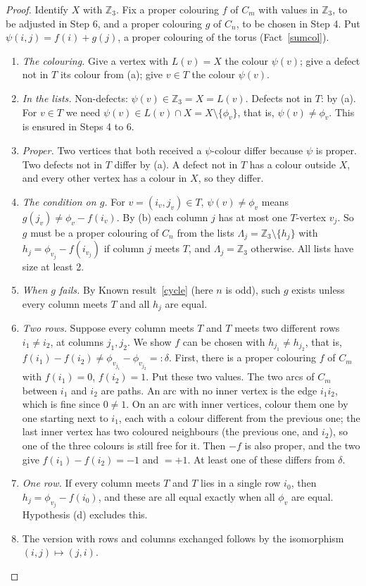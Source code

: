 \documentclass[11pt]{article}
\theoremstyle{plain}
\theoremstyle{definition}
\theoremstyle{remark}
\newcommand{\Z}{\mathbb{Z}}
\newcommand{\sm}{\setminus}
\newenvironment{steps}[1][]{\begin{enumerate}[label=\textbf{Step \arabic*.},leftmargin=4.4em,itemsep=0.35em,#1]}{\end{enumerate}}
\begin{document}
\begin{proof}
Identify $X$ with $\Z_3$. Fix a proper colouring $f$ of $C_m$ with values in $\Z_3$, to be adjusted in Step 6, and a
proper colouring $g$ of $C_n$, to be chosen in Step 4. Put $\psi(i, j) = f(i) + g(j)$, a proper colouring of the torus
(Fact~\ref{sumcol}).
\begin{steps}
\item \emph{The colouring.} Give a vertex with $L(v) = X$ the colour $\psi(v)$; give a defect not in $T$ its colour
from (a); give $v \in T$ the colour $\psi(v)$.
\item \emph{In the lists.} Non-defects: $\psi(v) \in \Z_3 = X = L(v)$. Defects not in $T$: by (a). For $v \in T$ we need
$\psi(v) \in L(v) \cap X = X \sm \{\phi_v\}$, that is, $\psi(v) \ne \phi_v$. This is ensured in Steps 4 to 6.
\item \emph{Proper.} Two vertices that both received a $\psi$-colour differ because $\psi$ is proper. Two defects not in
$T$ differ by (a). A defect not in $T$ has a colour outside $X$, and every other vertex has a colour in $X$, so they
differ.
\item \emph{The condition on $g$.} For $v = (i_v, j_v) \in T$, $\psi(v) \ne \phi_v$ means $g(j_v) \ne \phi_v - f(i_v)$. By (b)
each column $j$ has at most one $T$-vertex $v_j$. So $g$ must be a proper colouring of $C_n$ from the lists
$\Lambda_j = \Z_3 \sm \{h_j\}$ with $h_j = \phi_{v_j} - f(i_{v_j})$ if column $j$ meets $T$, and $\Lambda_j = \Z_3$
otherwise. All lists have size at least 2.
\item \emph{When $g$ fails.} By Known result~\ref{cycle} (here $n$ is odd), such $g$ exists unless every column meets $T$
and all $h_j$ are equal.
\item \emph{Two rows.} Suppose every column meets $T$ and $T$ meets two different rows $i_1 \ne i_2$, at columns
$j_1, j_2$. We show $f$ can be chosen with $h_{j_1} \ne h_{j_2}$, that is, $f(i_1) - f(i_2) \ne \phi_{v_{j_1}} - \phi_{v_{j_2}}
=: \delta$. First, there is a proper colouring $f$ of $C_m$ with $f(i_1) = 0$, $f(i_2) = 1$. Put these two values. The two
arcs of $C_m$ between $i_1$ and $i_2$ are paths. An arc with no inner vertex is the edge $i_1 i_2$, which is fine since
$0 \ne 1$. On an arc with inner vertices, colour them one by one starting next to $i_1$, each with a colour different from
the previous one; the last inner vertex has two coloured neighbours (the previous one, and $i_2$), so one of the three
colours is still free for it. Then $-f$ is also
proper, and the two give $f(i_1) - f(i_2) = -1$ and $= +1$. At least one of these differs from $\delta$.
\item \emph{One row.} If every column meets $T$ and $T$ lies in a single row $i_0$, then $h_j = \phi_{v_j} - f(i_0)$, and
these are all equal exactly when all $\phi_v$ are equal. Hypothesis (d) excludes this.
\item The version with rows and columns exchanged follows by the isomorphism $(i, j) \mapsto (j, i)$. \qedhere
\end{steps}
\end{proof}
\end{document}

